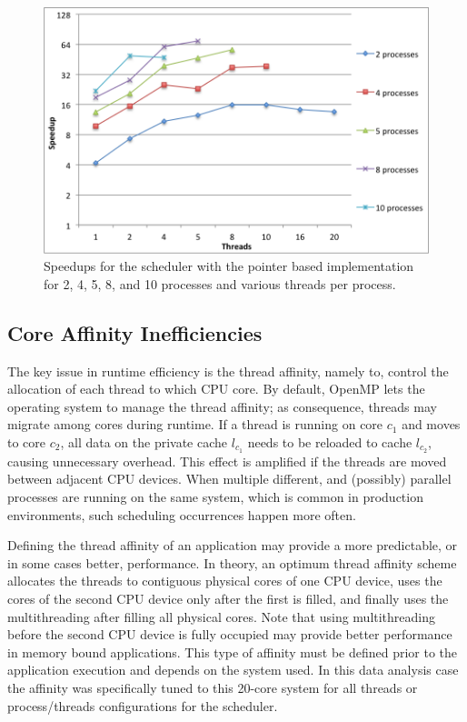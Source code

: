 \begin{figure}[!htp]
	\begin{center}
		\includegraphics[scale=0.5]{charts/speedup_sched.png}
		\caption{Speedups for the scheduler with the pointer based implementation for 2, 4, 5, 8, and 10 processes and various threads per process.}
		\label{fig:Sched}
	\end{center}
\end{figure}

\subsection{Core Affinity Inefficiencies}

The key issue in runtime efficiency is the thread affinity, namely to, control the allocation of each thread to which CPU core. By default, OpenMP lets the operating system to manage the thread affinity; as consequence, threads may migrate among cores during runtime. If a thread is running on core $c_1$ and moves to core $c_2$, all data on the private cache $l_{c_1}$ needs to be reloaded to cache $l_{c_2}$, causing unnecessary overhead. This effect is amplified if the threads are moved between adjacent CPU devices. When multiple different, and (possibly) parallel processes are running on the same system, which is common in production environments, such scheduling occurrences happen more often.

Defining the thread affinity of an application may provide a more predictable, or in some cases better, performance. In theory, an optimum thread affinity scheme allocates the threads to contiguous physical cores of one CPU device, uses the cores of the second CPU device only after the first is filled, and finally uses the multithreading after filling all physical cores. Note that using multithreading before the second CPU device is fully occupied may provide better performance in memory bound applications. This type of affinity must be defined prior to the application execution and depends on the system used. In this data analysis case the affinity was specifically tuned to this 20-core system for all threads or process/threads configurations for the scheduler.

